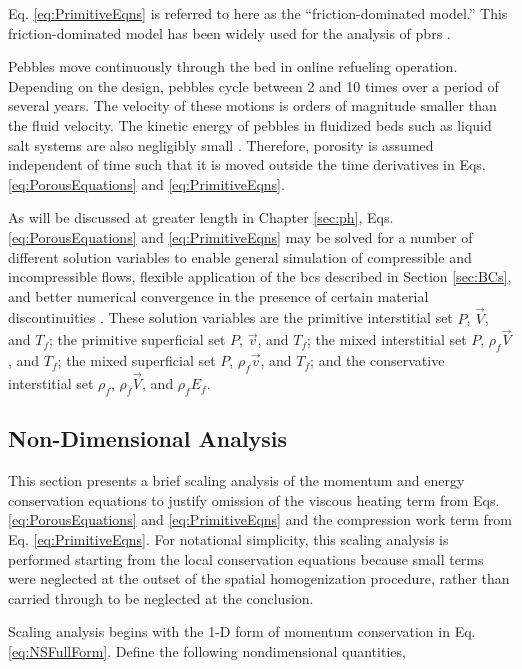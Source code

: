 \noindent Eq. \eqref{eq:PrimitiveEqns} is referred to here as the ``friction-dominated model.'' This friction-dominated model has been widely used for the analysis of \glspl{pbr} \cite{hossain, nouri, tecdoc1163}.  

Pebbles move continuously through the bed in online refueling operation. Depending on the design, pebbles cycle between 2 and 10 times over a period of several years. The velocity of these motions is orders of magnitude smaller than the fluid velocity. The kinetic energy of pebbles in fluidized beds such as liquid salt systems are also negligibly small \cite{mardus_hall}. Therefore, porosity is assumed independent of time such that it is moved outside the time derivatives in Eqs. \eqref{eq:PorousEquations} and \eqref{eq:PrimitiveEqns}.

As will be discussed at greater length in Chapter \ref{sec:ph}, Eqs. \eqref{eq:PorousEquations} and \eqref{eq:PrimitiveEqns} may be solved for a number of different solution variables to enable general simulation of compressible and incompressible flows, flexible application of the \glspl{bc} described in Section \ref{sec:BCs}, and better numerical convergence in the presence of certain material discontinuities \cite{hauke_1998}. These solution variables are the primitive interstitial set \(P\), \(\vec{V}\), and \(T_f\); the primitive superficial set \(P\), \(\vec{v}\), and \(T_f\); the mixed interstitial set \(P\), \(\rho_f\vec{V}\), and \(T_f\); the mixed superficial set \(P\), \(\rho_f\vec{v}\), and \(T_f\); and the conservative interstitial set \(\rho_f\), \(\rho_f\vec{V}\), and \(\rho_fE_f\).

\subsection{Non-Dimensional Analysis}
\label{sec:NonDim}

This section presents a brief scaling analysis of the momentum and energy conservation equations to justify omission of the viscous heating term from Eqs. \eqref{eq:PorousEquations} and \eqref{eq:PrimitiveEqns} and the compression work term from Eq. \eqref{eq:PrimitiveEqns}. For notational simplicity, this scaling analysis is performed starting from the local conservation equations because small terms were neglected at the outset of the spatial homogenization procedure, rather than carried through to be neglected at the conclusion.

Scaling analysis begins with the 1-D form of momentum conservation in Eq. \eqref{eq:NSFullForm}. Define the following nondimensional quantities,

